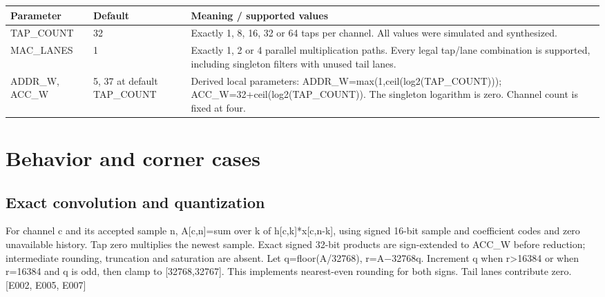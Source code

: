 \documentclass[11pt,a4paper]{article}
\begin{document}
{\small\renewcommand{\arraystretch}{1.18}\begin{longtable}{@{}L{0.22\textwidth}|L{0.21\textwidth}|L{0.49\textwidth}@{}}\toprule

\textbf{Parameter} & \textbf{Default} & \textbf{Meaning /\allowbreak{} supported values}\\\midrule\endhead

TAP\_\allowbreak{}COUNT & 32 & Exactly 1,\allowbreak{} 8,\allowbreak{} 16,\allowbreak{} 32 or 64 taps per channel. All values were simulated and synthesized.\\[2pt]\hline

MAC\_\allowbreak{}LANES & 1 & Exactly 1,\allowbreak{} 2 or 4 parallel multiplication paths. Every legal tap/\allowbreak{}lane combination is supported,\allowbreak{} including singleton filters with unused tail lanes.\\[2pt]\hline

ADDR\_\allowbreak{}W,\allowbreak{} ACC\_\allowbreak{}W & 5,\allowbreak{} 37 at default TAP\_\allowbreak{}COUNT & Derived local parameters: ADDR\_\allowbreak{}W=\allowbreak{}max(\allowbreak{}1,\allowbreak{}ceil(\allowbreak{}log2(\allowbreak{}TAP\_\allowbreak{}COUNT)\allowbreak{})\allowbreak{})\allowbreak{}; ACC\_\allowbreak{}W=\allowbreak{}32+\allowbreak{}ceil(\allowbreak{}log2(\allowbreak{}TAP\_\allowbreak{}COUNT)\allowbreak{})\allowbreak{}. The singleton logarithm is zero. Channel count is fixed at four.\\[2pt]\hline

\bottomrule\end{longtable}}

\section{Behavior and corner cases}

\subsection{Exact convolution and quantization}

For channel c and its accepted sample n,\allowbreak{} A[\allowbreak{}c,\allowbreak{}n]\allowbreak{}=\allowbreak{}sum over k of h[\allowbreak{}c,\allowbreak{}k]\allowbreak{}*\allowbreak{}x[\allowbreak{}c,\allowbreak{}n-k]\allowbreak{},\allowbreak{} using signed 16-bit sample and coefficient codes and zero unavailable history. Tap zero multiplies the newest sample. Exact signed 32-bit products are sign-extended to ACC\_\allowbreak{}W before reduction; intermediate rounding,\allowbreak{} truncation and saturation are absent. Let q=\allowbreak{}floor(\allowbreak{}A/\allowbreak{}32768)\allowbreak{},\allowbreak{} r=\allowbreak{}A{\vulcanmathsymbols −}32768q. Increment q when r>16384 or when r=\allowbreak{}16384 and q is odd,\allowbreak{} then clamp to [32768,\allowbreak{}32767]\allowbreak{}. This implements nearest-even rounding for both signs. Tail lanes contribute zero. [\allowbreak{}E002,\allowbreak{} E005,\allowbreak{} E007]\allowbreak{}
\end{document}
